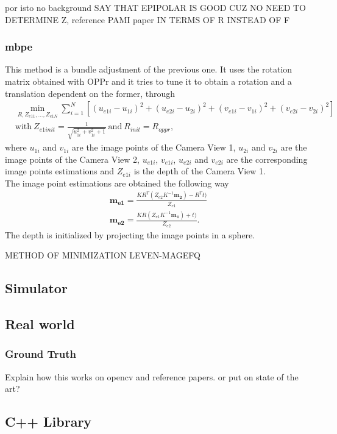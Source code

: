 por isto no background
SAY THAT EPIPOLAR IS GOOD CUZ NO NEED TO DETERMINE Z, reference PAMI paper
IN TERMS OF R INSTEAD OF F
\subsubsection{\acrlong{mbpe}}
\label{MBaPE}
This method is a bundle adjustment of the previous one. It uses the rotation matrix obtained with OPPr and it tries to tune it to obtain a rotation and a translation dependent on the former, through 
\begin{align*}
	& \min_{R, Z_{e11}, ..., Z_{e1N}} \sum^N_{i=1} [(u_{e1i}-u_{1i})^2 + (u_{e2i}-u_{2i})^2 + (v_{e1i}-v_{1i})^2 + (v_{e2i}-v_{2i})^2]\\
	& \text{with} \ Z_{e1init} = \frac{1}{\sqrt{u_{1i}^2 + v_{1i}^2 + 1}} \ \text{and} \ R_{init} = R_{oppr},
\end{align*}
where $u_{1i}$ and $v_{1i}$ are the image points of the Camera View 1, $u_{2i}$ and $v_{2i}$ are the image points of the Camera View 2, $u_{e1i}$, $v_{e1i}$, $u_{e2i}$ and $v_{e2i}$ are the corresponding image points estimations and $Z_{e1i}$ is the depth of the Camera View 1.\\
The image point estimations are obtained the following way
\begin{align*}
	\mathbf{m_{e1}} = \frac{KR^T(Z_{e2}K^{-1}\mathbf{m_2}) - R^Tt)}{Z_{e1}}\\
	\mathbf{m_{e2}} = \frac{KR(Z_{e1}K^{-1}\mathbf{m_1}) + t)}{Z_{e2}}.
\end{align*} The depth is initialized by projecting the image points in a sphere.

METHOD OF MINIMIZATION LEVEN-MAGEFQ

\subsection{Simulator}

\subsection{Real world}

\subsubsection{Ground Truth}

Explain how this works on opencv and reference papers. or put on state of the art?

\subsection{C++ Library}
